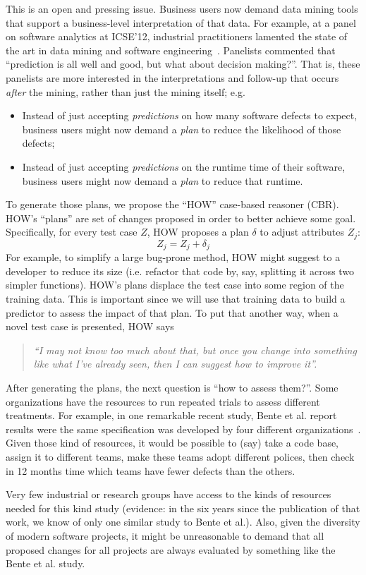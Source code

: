 \documentclass[conference]{IEEEtran}
\newcommand{\bi}{\begin{itemize}}
\newcommand{\ei}{\end{itemize}}
\begin{document}
This is an open and pressing issue.
Business  users   now demand   data mining tools
that  support a  business-level
interpretation of that data. For example,
at a  panel on software analytics at ICSE'12,
industrial practitioners lamented the state of the art in data mining
and software engineering~\cite{menzies12a}. Panelists commented that
``prediction is all well and good, but what about decision
making?''. That is, these panelists are more interested in the interpretations
and follow-up
that occurs {\em after} the mining, rather than just  the mining itself; e.g.
\bi
\item 
Instead of just accepting  {\em predictions} on how many 
 software defects
to expect,  business users might now demand a {\em plan} to
reduce the likelihood of those defects;
\item Instead of just accepting {\em predictions} on the runtime
time of their software, business users might now demand
a {\em plan} to reduce that runtime.
\ei
To generate those plans, we propose the ``HOW'' case-based reasoner (CBR).
HOW's  ``plans'' are  set of changes
proposed  in order to better achieve some goal. 
Specifically, for every test case $Z$, HOW proposes a  plan $\delta$ to
  adjust   attributes $Z_j$:
\[
Z_j = Z_j + \delta_j
\]
For example, to simplify a  large bug-prone  method, HOW might suggest
to a developer to reduce its size (i.e.  refactor that code by, say, splitting it across
two simpler functions).
HOW's  plans displace the test case into some region
of the training data. This is important since we will use that training data
to build a predictor to assess the impact of that plan.
To put that another way, when a novel test case is presented,
HOW says 
\begin{quote}{\em ``I may not know too much about that, but once you change into something like
what I've already seen, then I can suggest how to improve it''.}
\end{quote}
After generating the plans, the next question is ``how to assess them?''.  
Some organizations have the resources to 
run repeated trials to assess  different treatments.
For example, in one remarkable recent study, Bente et al. report results
were the same specification was developed  by four different organizations~\cite{Anda2009}. Given those kind of resources, it would be possible
to (say) take a code base, assign it to different teams, make these teams  adopt different polices,
then check in 12 months time
 which teams have fewer defects than the others.  

Very few industrial or research groups have access
to the kinds of resources needed for this kind study  (evidence: in the six years since the
publication of that work, we know of only one   similar study to Bente et al.). Also, given the
diversity of modern software projects, it might be unreasonable to demand that all
proposed changes for all projects are always evaluated by something like the Bente et al. study.
\end{document}
